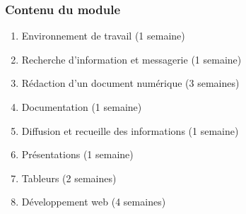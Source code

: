 \documentclass{beamer}
\begin{document}
\begin{frame}
\frametitle{Contenu du module}

\begin{enumerate}
	\item Environnement de travail (1 semaine)
	\item Recherche d'information et messagerie (1 semaine)
	\item Rédaction d'un document numérique (3 semaines)
	\item Documentation (1 semaine)
	\item Diffusion et recueille des informations (1 semaine)
	\item Présentations (1 semaine)
	\item Tableurs (2 semaines) 
	\item Développement web (4 semaines)
\end{enumerate}

\end{frame}

%
% 
\end{document}

